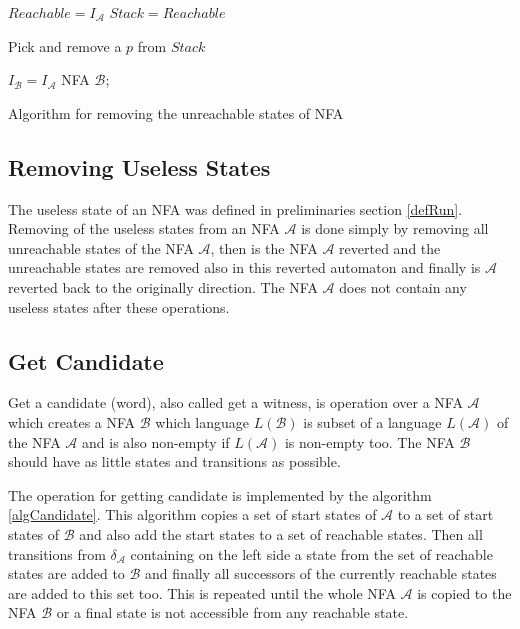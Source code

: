 \begin{algorithm}[H]
	\label{algRemove}

  $Reachable = I_\mathcal{A}$\;
  $Stack = Reachable$\;
	
   {
			Pick and remove a $p$ from $Stack$\;
	 }

  $I_{\mathcal{B}} = I_{\mathcal{A}}$\;
		\Return NFA $\mathcal{B}$;
	\caption{Algorithm for removing the unreachable states of NFA}
\end{algorithm}

\subsection{Removing Useless States}
The useless state of an NFA was defined in preliminaries section \ref{defRun}. Removing of the useless states from an NFA $\mathcal{A}$ is done simply by
removing all unreachable states of the NFA $\mathcal{A}$, 
then is the NFA $\mathcal{A}$ reverted and the unreachable states are removed also in this reverted automaton and finally is $\mathcal{A}$ reverted back to the
originally direction. The NFA $\mathcal{A}$ does not contain any useless states after these operations.

\subsection{Get Candidate}
Get a candidate (word), also called get a witness, is operation over a NFA $\mathcal{A}$ which creates a NFA $\mathcal{B}$ which language $L(\mathcal{B})$
is subset of a language $L(\mathcal{A})$ of the NFA $\mathcal{A}$ and is also non-empty if $L(\mathcal{A})$ is non-empty too.
The NFA $\mathcal{B}$ should have as little states and transitions as possible.

The operation for getting candidate is implemented by the algorithm \ref{algCandidate}. This algorithm copies a set of start states 
of $\mathcal{A}$ to a set of start states of $\mathcal{B}$ and also add the start states to a set of reachable states. 
Then all transitions from $\delta_\mathcal{A}$ containing on the left side a state from the set of reachable states are added to $\mathcal{B}$ and finally
all successors of the currently reachable states are added to this set too. This is repeated until the whole NFA $\mathcal{A}$ is copied to the NFA 
$\mathcal{B}$ or a final state is not accessible from any reachable state. 
\\

